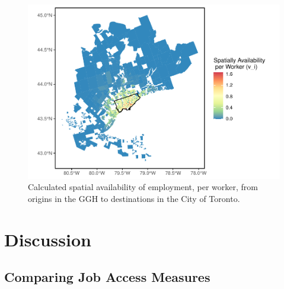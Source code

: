 \documentclass[]{elsarticle} %
\begin{document}
\begin{figure}
\includegraphics[width=1\linewidth]{Spatial-Availability_files/figure-latex/plot-avail-Toronto-TTS-per-worker-1} \caption{\label{fig:plot-avail-Toronto-TTS-per-worker}Calculated spatial availability of employment, per worker, from origins in the GGH to destinations in the City of Toronto.}\label{fig:plot-avail-Toronto-TTS-per-worker}
\end{figure}

\hypertarget{discussion}{%
\section{Discussion}\label{discussion}}

\hypertarget{comparing-job-access-measures}{%
\subsection{Comparing Job Access
Measures}\label{comparing-job-access-measures}}
\end{document}
